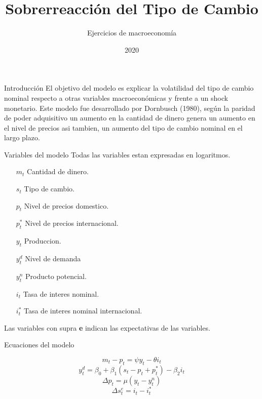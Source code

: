 \documentclass[12pt]{beamer}
\author{Ejercicios de macroeconomía}
\title{Sobrerreacción del Tipo de Cambio}
\date{2020}
\begin{document}
\setlength{\parindent}{0cm}

\begin{frame}
\titlepage
\end{frame}

\begin{frame}{Introducción}
El objetivo del modelo es explicar la volatilidad del tipo de cambio nominal respecto a otras variables macroeconómicas y frente a un shock monetario.
Este modelo fue desarrollado por Dornbusch (1980), según la paridad de poder adquisitivo un aumento en la cantidad de dinero genera un aumento en el nivel de precios asi tambien, un aumento del tipo de cambio nominal en el largo plazo. 
\end{frame}

\begin{frame}{Variables del modelo}
Todas las variables estan expresadas en logaritmos.
\begin{itemize}
    \item[$m_t$] Cantidad de dinero.
    \item[$s_t$] Tipo de cambio.
    \item[$p_t$] Nivel de precios domestico. 
    \item[$p_t^*$] Nivel de precios internacional.
    \item[$y_t$] Produccion.
    \item[$y_t^d$] Nivel de demanda
    \item[$y_t^n$] Producto potencial. 
    \item[$i_t$] Tasa de interes nominal.
    \item[$i_t^*$] Tasa de interes nominal internacional.
\end{itemize}  
Las variables con supra \textbf{e} indican las expectativas de las variables. 
\end{frame}

\begin{frame}{Ecuaciones del modelo}

$$m_t - p_t = \psi y_t - \theta i_t$$
$$y^{d}_t = \beta_0 + \beta_1(s_t - p_t + p^*_t) - \beta_2 i_t$$
$$\Delta p_t = \mu (y_t - y^n_t)$$
$$\Delta s_t^e = i_t - i_t ^*$$



\end{frame}

\end{document}
